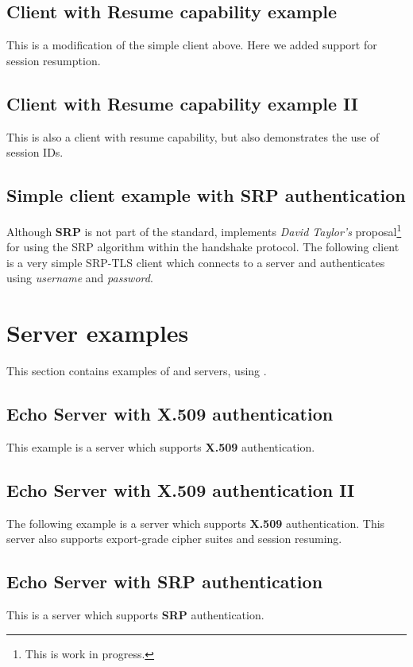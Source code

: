 

\subsection{Client with Resume capability example}
\label{resume-example}
This is a modification of the simple client above. Here we added support 
for session resumption.


\subsection{Client with Resume capability example II}
\label{resume-example2}
This is also a client with resume capability, but also demonstrates
the use of session IDs.


\subsection{Simple client example with SRP authentication}
Although {\bf SRP} is not part of the \tls{} standard, \gnutls{} implements
{\it David Taylor's} proposal\footnote{This is work in progress.}  for using the SRP algorithm
within the \tls{} handshake protocol. The following client
is a very simple SRP-TLS client which connects to a server 
and authenticates using {\it username} and {\it password}.



\section{Server examples}
This section contains examples of \tls{} and \ssl{} servers, using \gnutls{}.

\subsection{Echo Server with X.509 authentication}
This example is a server which supports {\bf X.509} authentication.


\subsection{Echo Server with X.509 authentication II}
The following example is a server which supports {\bf X.509} authentication.
This server also supports export-grade cipher suites and session resuming.


\subsection{Echo Server with SRP authentication}
This is a server which supports {\bf SRP} authentication.



